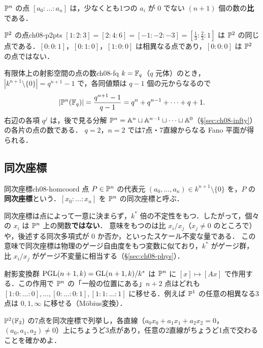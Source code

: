$\mathbb{P}^n$ の点 $[a_0:\dots:a_n]$ は，少なくとも1つの $a_i$ が $0$ でない $(n+1)$ 個の数の\textbf{比}である．

\begin{myex}{$\mathbb{P}^2$ の点}{ch08-p2pts}
$[1:2:3]=[2:4:6]=[-1:-2:-3]=[\tfrac13:\tfrac23:1]$ は $\mathbb{P}^2$ の同じ点である．$[0:0:1]$，$[0:1:0]$，$[1:0:0]$ は相異なる点であり，$[0:0:0]$ は $\mathbb{P}^2$ の点ではない．
\end{myex}

\begin{myex}{有限体上の射影空間の点の数}{ch08-fq}
$k=\mathbb{F}_q$（$q$ 元体）のとき，$|k^{n+1}\setminus\{0\}|=q^{n+1}-1$ で，各同値類は $q-1$ 個の元からなるので
\[
  |\mathbb{P}^n(\mathbb{F}_q)|=\frac{q^{n+1}-1}{q-1}=q^n+q^{n-1}+\cdots+q+1.
\]
右辺の各項 $q^j$ は，後で見る分解 $\mathbb{P}^n=\mathbb{A}^n\sqcup\mathbb{A}^{n-1}\sqcup\cdots\sqcup\mathbb{A}^0$（\S\ref{sec:ch08-infty}）の各片の点の数である．
$q=2$，$n=2$ では7点・7直線からなる Fano 平面が得られる．
\end{myex}

\subsection{同次座標}

\begin{mydef}{同次座標}{ch08-homcoord}
点 $P\in\mathbb{P}^n$ の代表元 $(a_0,\dots,a_n)\in k^{n+1}\setminus\{0\}$ を，$P$ の\textbf{同次座標}という．$[x_0:\dots:x_n]$ を $\mathbb{P}^n$ の同次座標と呼ぶ．
\end{mydef}

同次座標は点によって一意に決まらず，$k^*$ 倍の不定性をもつ．したがって，個々の $x_i$ は $\mathbb{P}^n$ 上の関数\textbf{ではない}．
意味をもつのは比 $x_i/x_j$（$x_j\ne0$ のところで）や，後述する同次多項式が $0$ か否か，といったスケール不変な量である．
この意味で同次座標は物理のゲージ自由度をもつ変数に似ており，$k^*$ がゲージ群，比 $x_i/x_j$ がゲージ不変量に相当する（\S\ref{sec:ch08-phys}）．

射影変換群 $\operatorname{PGL}(n+1,k)=\operatorname{GL}(n+1,k)/k^*$ は $\mathbb{P}^n$ に $[x]\mapsto[Ax]$ で作用する．この作用で $\mathbb{P}^n$ の「一般の位置にある」$n+2$ 点はどれも
$[1:0:\dots:0],\dots,[0:\dots:0:1],[1:1:\dots:1]$ に移せる．例えば $\mathbb{P}^1$ の任意の相異なる3点は $0,1,\infty$ に移せる（Möbius変換）．

$\mathbb{P}^2(\mathbb{F}_2)$ の7点を同次座標で列挙し，各直線（$a_0x_0+a_1x_1+a_2x_2=0$，$(a_0,a_1,a_2)\neq0$）上にちょうど3点があり，任意の2直線がちょうど1点で交わることを確かめよ．

